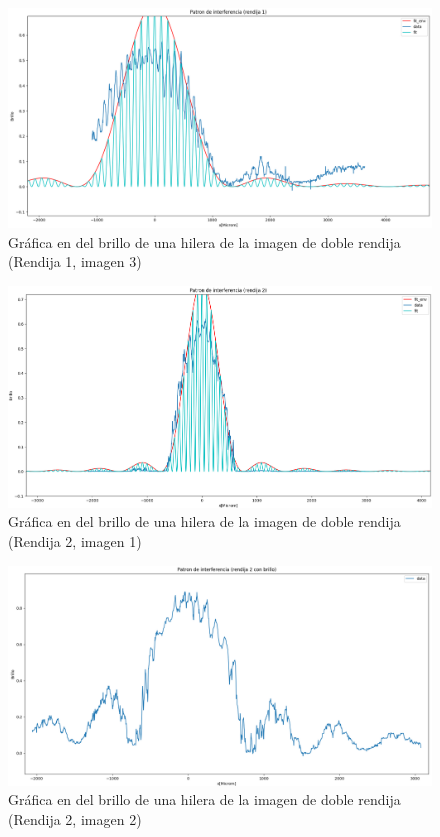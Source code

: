 \documentclass[12p]{article}
\begin{document}
\begin{figure}[h]
  \includegraphics[width=1.0\textwidth]{3pg.png}
  \centering
  \caption{Gráfica en del brillo de una hilera de la imagen de doble rendija (Rendija 1, imagen 3)}
\end{figure} 

\begin{figure}[h]
  \includegraphics[width=1.0\textwidth]{apg.png}
  \centering
  \caption{Gráfica en del brillo de una hilera de la imagen de doble rendija (Rendija 2, imagen 1)}
\end{figure}

\begin{figure}[h]
  \includegraphics[width=1.0\textwidth]{bpg.png}
  \centering
  \caption{Gráfica en del brillo de una hilera de la imagen de doble rendija (Rendija 2, imagen 2)}
\end{figure} 
\end{document}
